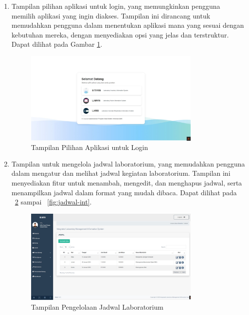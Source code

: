 \begin{enumerate}
	\item Tampilan pilihan aplikasi untuk login, yang memungkinkan pengguna memilih aplikasi yang ingin diakses. Tampilan ini dirancang untuk memudahkan pengguna dalam menentukan aplikasi mana yang sesuai dengan kebutuhan mereka, dengan menyediakan opsi yang jelas dan terstruktur. Dapat dilihat pada Gambar \ref{fig:pilih-login}.
	      \begin{figure}
		      \centering
		      \includegraphics[width=0.82\textwidth]{konten/gambar/hasil/pilih-aplikasi.jpeg}
		      \caption{Tampilan Pilihan Aplikasi untuk Login}
		      \label{fig:pilih-login}
	      \end{figure}
	\item Tampilan untuk mengelola jadwal laboratorium, yang memudahkan pengguna dalam mengatur dan melihat jadwal kegiatan laboratorium. Tampilan ini menyediakan fitur untuk menambah, mengedit, dan menghapus jadwal, serta menampilkan jadwal dalam format yang mudah dibaca. Dapat dilihat pada \pic~\ref{fig:jadwal} sampai \pic~\ref{fig:jadwal-int}.
	      \begin{figure}
		      \centering
		      \includegraphics[width=0.82\textwidth]{konten/gambar/hasil/jadwal.jpeg}
		      \caption{Tampilan Pengelolaan Jadwal Laboratorium}
		      \label{fig:jadwal}
	      \end{figure}
	      \begin{figure}
		      \centering

\end{figure}
\end{enumerate}
